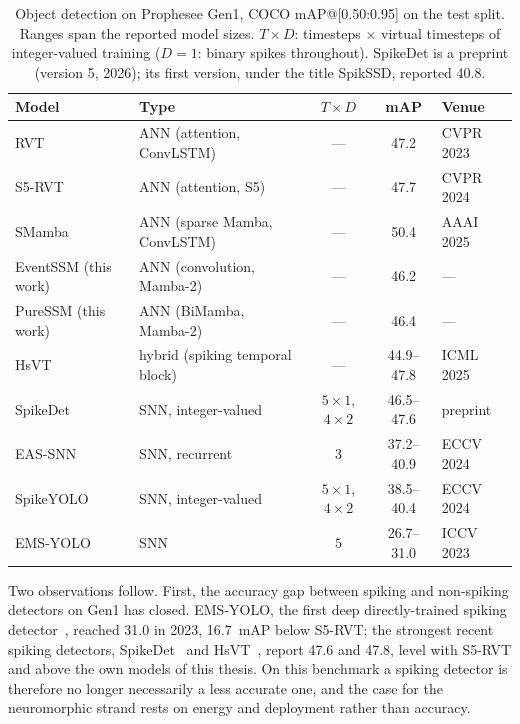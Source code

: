 \documentclass[11pt, a4paper]{report}
\begin{document}
\begin{table}[htbp]
\centering
\small
\caption{Object detection on Prophesee Gen1, COCO mAP@[0.50:0.95] on the test split. Ranges span the
reported model sizes. $T\times D$: timesteps $\times$ virtual timesteps of integer-valued training
($D=1$: binary spikes throughout). SpikeDet is a preprint (version 5, 2026); its first version, under
the title SpikSSD, reported 40.8.}
\label{tab:snn_landscape}
\begin{tabularx}{\textwidth}{@{}l>{\raggedright\arraybackslash}Xccl@{}}
\toprule
\textbf{Model} & \textbf{Type} & \textbf{$T\times D$} & \textbf{mAP} & \textbf{Venue} \\
\midrule
RVT \cite{gehrig2023recurrent}        & ANN (attention, ConvLSTM) & --- & 47.2 & CVPR 2023 \\
S5-RVT \cite{zubic2024state}          & ANN (attention, S5)       & --- & 47.7 & CVPR 2024 \\
SMamba \cite{yang2025smamba}          & ANN (sparse Mamba, ConvLSTM) & --- & 50.4 & AAAI 2025 \\
EventSSM (this work)                  & ANN (convolution, Mamba-2) & --- & 46.2 & --- \\
PureSSM (this work)                   & ANN (BiMamba, Mamba-2)    & --- & 46.4 & --- \\
\midrule
HsVT \cite{xu2025hybrid}              & hybrid (spiking temporal block) & --- & 44.9--47.8 & ICML 2025 \\
SpikeDet \cite{fan2025spikedet}       & SNN, integer-valued       & $5\times1$, $4\times2$ & 46.5--47.6 & preprint \\
EAS-SNN \cite{wang2024eas}            & SNN, recurrent            & $3$ & 37.2--40.9 & ECCV 2024 \\
SpikeYOLO \cite{luo2024integer}       & SNN, integer-valued       & $5\times1$, $4\times2$ & 38.5--40.4 & ECCV 2024 \\
EMS-YOLO \cite{su2023deep}            & SNN                       & $5$ & 26.7--31.0 & ICCV 2023 \\
\bottomrule
\end{tabularx}
\end{table}

Two observations follow. First, the accuracy gap between spiking and non-spiking detectors on Gen1 has
closed. EMS-YOLO, the first deep directly-trained spiking detector~\cite{su2023deep}, reached 31.0 in 2023,
16.7~mAP below S5-RVT; the strongest recent spiking detectors, SpikeDet~\cite{fan2025spikedet} and
HsVT~\cite{xu2025hybrid}, report 47.6 and 47.8, level with S5-RVT and above the own models of this thesis.
On this benchmark a spiking detector is therefore no longer necessarily a less accurate one, and the case
for the neuromorphic strand rests on energy and deployment rather than accuracy.
\end{document}
